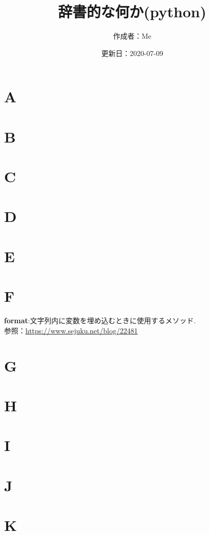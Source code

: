 \documentclass[a4paper,10pt,titlepage]{jsarticle}
\title{辞書的な何か(python)}
\date{更新日：2020-07-09}
\author{作成者：Me}
\begin{document}
\maketitle

\section{A}

\section{B}

\section{C}

\section{D}

\section{E}

\section{F}

\textbf{format}:文字列内に変数を埋め込むときに使用するメソッド.\\
参照：\url{https://www.sejuku.net/blog/22481}

\section{G}

\section{H}

\section{I}

\section{J}

\section{K}
\end{document}
